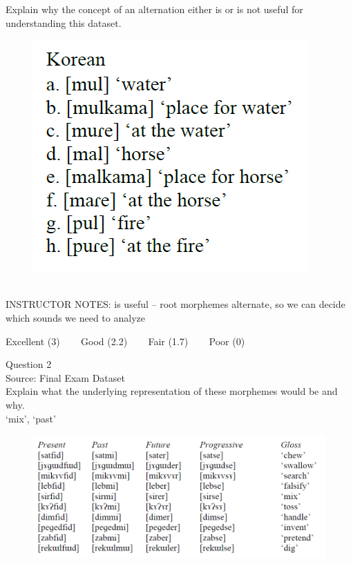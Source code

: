 \documentclass[12pt]{article}
\begin{document}
Explain why the concept of an alternation either is or is not useful for understanding this dataset.\\

\begin{figure}[H]
\includegraphics{../images/korean.png}
\end{figure}

~\\
INSTRUCTOR NOTES: is useful -- root morphemes alternate, so we can decide which sounds we need to analyze


\vfill
Excellent (3) ~~~ Good (2.2) ~~~ Fair (1.7) ~~~ Poor (0)
\newpage

{\large Question 2}\\

Source: Final Exam Dataset\\

Explain what the underlying representation of these morphemes would be and why.\\

`mix', `past'

\begin{figure}[H]
\includegraphics{../images/final_dataset.png}
\end{figure}
\end{document}
